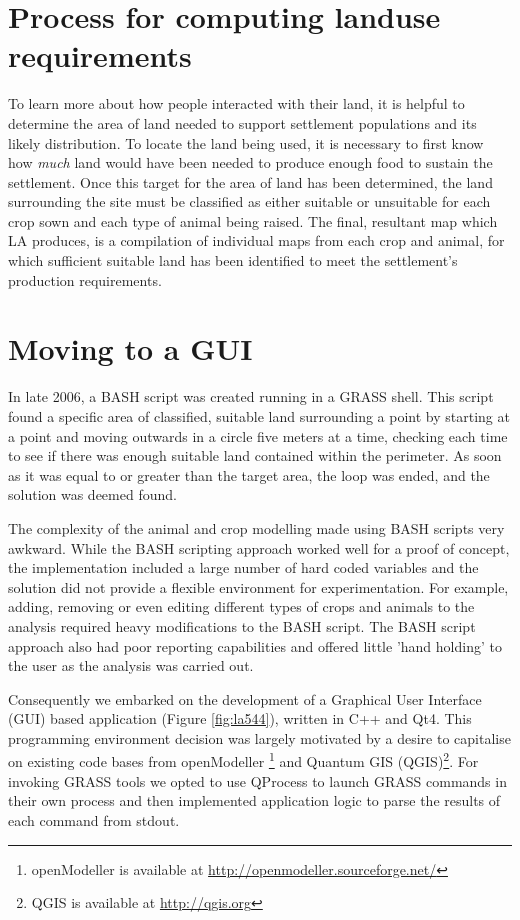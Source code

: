 \section{Process for computing landuse requirements} 
\label{sec:EarlyAttempts} 
  To learn more about how people interacted with their land, it is
  helpful to determine the area of land needed to support settlement
  populations and its likely distribution.  To locate the land being used, it is
  necessary to first know how \textit{much} land would have been needed to
  produce enough food to sustain the settlement.  Once this target for the area of land
  has been determined, the land surrounding the site must be classified as
  either suitable or unsuitable for each crop sown and each type of animal being
  raised.  The final, resultant map which LA produces, is a compilation of individual
  maps from each crop and animal, for which sufficient suitable land has been
  identified to meet the settlement's production requirements.

\section{Moving to a GUI} \label{GUI} 
  In late 2006, a BASH script was created running in a GRASS shell. This script
  found a specific area of classified, suitable land surrounding a point by
  starting at a point and moving outwards in a circle five meters at a time,
  checking each time to see if there was enough suitable land contained within
  the perimeter. As soon as it was equal to or greater than the target area, the
  loop was ended, and the solution was deemed found.
  
  The complexity of the animal and crop modelling made using BASH scripts very
  awkward.  While the BASH scripting approach worked well for a proof of
  concept, the implementation included a large number of hard coded variables and the
  solution did not provide a flexible environment for experimentation. For
  example, adding, removing or even editing different types of crops and animals
  to the analysis required heavy modifications to the BASH script.  The BASH
  script approach also had poor reporting capabilities and offered
  little 'hand holding' to the user as the analysis was carried out.
  
  Consequently we embarked on the development of a Graphical User Interface (GUI)
  based application (Figure \ref{fig:la544}), written in C++ and Qt4. This
  programming environment decision was largely motivated by a desire to
  capitalise on existing code bases from openModeller \footnote{openModeller is
  available at \url{http://openmodeller.sourceforge.net/}} and Quantum GIS
  (QGIS)\footnote{QGIS is available at \url{http://qgis.org}}.  For invoking
  GRASS tools we opted to use QProcess to launch GRASS commands in their own
  process and then implemented application logic to parse the results of each
  command from stdout.

